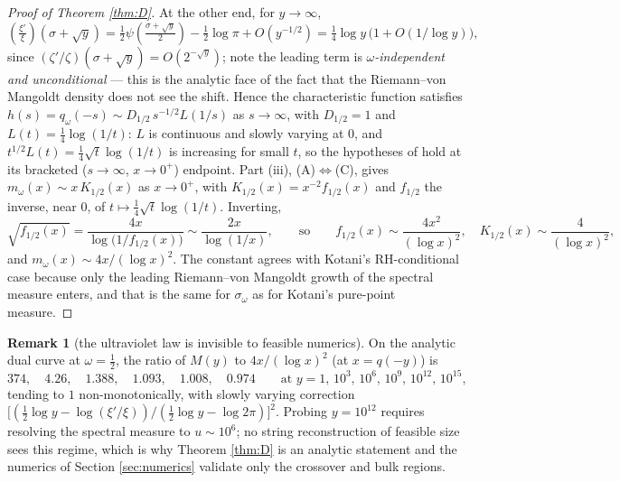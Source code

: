 \documentclass[11pt,reqno]{amsart}
\theoremstyle{plain}
\theoremstyle{definition}
\newtheorem{remark}[theorem]{Remark}
\newcommand{\lxi}[1]{\left(\tfrac{\xi'}{\xi}\right)\!#1}
\begin{document}
\begin{proof}[Proof of Theorem \ref{thm:D}]
At the other end, for $y\to\infty$,
\begin{equation}\label{eq:largey}
  \lxi{(\sigma+\sqrt y)}
  =\tfrac12\psi\!\left(\tfrac{\sigma+\sqrt y}2\right)-\tfrac12\log\pi+O(y^{-1/2})
  =\tfrac14\log y\,\bigl(1+O(1/\log y)\bigr),
\end{equation}
since $(\zeta'/\zeta)(\sigma+\sqrt y)=O(2^{-\sqrt y})$; note the leading term is
\emph{$\omega$-independent and unconditional} --- this is the analytic face of the fact that
the Riemann--von Mangoldt density does not see the shift. Hence the characteristic function
satisfies $h(s)=q_\omega(-s)\sim D_{1/2}\,s^{-1/2}L(1/s)$ as $s\to\infty$, with $D_{1/2}=1$ and
$L(t)=\tfrac14\log(1/t)$: $L$ is continuous and slowly varying at $0$, and
$t^{1/2}L(t)=\tfrac14\sqrt t\log(1/t)$ is increasing for small $t$, so the hypotheses of
\cite[Thm.~2]{Kasahara} hold at its bracketed ($s\to\infty$, $x\to0^+$) endpoint. Part (iii),
(A)$\Leftrightarrow$(C), gives $m_\omega(x)\sim x\,K_{1/2}(x)$ as $x\to0^+$, with
$K_{1/2}(x)=x^{-2}f_{1/2}(x)$ and $f_{1/2}$ the inverse, near $0$, of
$t\mapsto\tfrac14\sqrt t\log(1/t)$. Inverting,
\[
  \sqrt{f_{1/2}(x)}
  =\frac{4x}{\log\bigl(1/f_{1/2}(x)\bigr)}
  \sim\frac{2x}{\log(1/x)},
  \qquad\text{so}\qquad
  f_{1/2}(x)\sim\frac{4x^2}{(\log x)^2},
  \quad
  K_{1/2}(x)\sim\frac4{(\log x)^2},
\]
and $m_\omega(x)\sim4x/(\log x)^2$. The constant agrees with Kotani's RH-conditional case
\cite{Kotani} because only the leading Riemann--von Mangoldt growth of the spectral measure
enters, and that is the same for $\sigma_\omega$ as for Kotani's pure-point measure.
\end{proof}

\begin{remark}[the ultraviolet law is invisible to feasible numerics]\label{rem:UVnumerics}
On the analytic dual curve at $\omega=\tfrac12$, the ratio of $M(y)$ to $4x/(\log x)^2$ (at
$x=q(-y)$) is
\[
  374,\quad 4.26,\quad 1.388,\quad 1.093,\quad 1.008,\quad 0.974
  \qquad\text{at } y=1,\,10^3,\,10^6,\,10^9,\,10^{12},\,10^{15},
\]
tending to $1$ non-monotonically, with slowly varying correction
$\bigl[(\tfrac12\log y-\log(\xi'/\xi))/(\tfrac12\log y-\log2\pi)\bigr]^2$. Probing $y=10^{12}$
requires resolving the spectral measure to $u\sim10^6$; no string reconstruction of feasible
size sees this regime, which is why Theorem \ref{thm:D} is an analytic statement and the
numerics of Section \ref{sec:numerics} validate only the crossover and bulk regions.
\end{remark}
\end{document}

